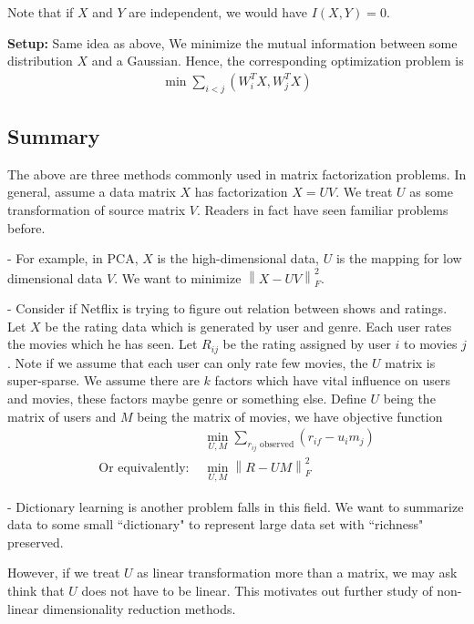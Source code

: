 Note that if $X$ and $Y$ are independent, we would have $I(X,Y) = 0$.

\textbf{Setup:}
Same idea as above, We minimize the mutual information between some distribution $X$ and a Gaussian. Hence, the corresponding optimization problem is
\begin{align*}
    \min \sum _{i<j} (W_i^TX,W^T_jX)
\end{align*}

\subsection{Summary}
The above are three methods commonly used in matrix factorization problems. In general, assume a data matrix $X$ has factorization $X = UV$. We treat $U$ as some transformation of source matrix $V$. Readers in fact have seen familiar problems before. 

- For example, in PCA, $X$ is the high-dimensional data, $U$ is the mapping for low dimensional data $V$. We want to minimize $\left\lVert X - UV\right\rVert^2_F$.

- Consider if Netflix is trying to figure out relation between shows and ratings. Let $X$ be the rating data which is generated by user and genre. Each user rates the movies which he has seen.
Let $R_{ij}$ be the rating assigned by user $i$ to movies $j$. Note if we assume that each user can only rate few movies, the $U$ matrix is super-sparse. We assume there are $k$ factors which have vital influence on users and movies, these factors maybe genre or something else. Define $U$ being the matrix of users and $M$ being the matrix of movies, we have objective function 
\begin{align*}
&\min_{U,M}\sum_{r_{ij} \text{ observed}}(r_{if} - u_im_j)\\
\text{Or equivalently: } & \min_{U,M} \left\lVert R - UM\right\rVert^2_F
\end{align*}

- Dictionary learning is another problem falls in this field. We want to summarize data to some small ``dictionary" to represent large data set with ``richness" preserved.

However, if we treat $U$ as linear transformation more than a matrix, we may ask think that $U$ does not have to be linear. This motivates out further study of non-linear dimensionality reduction methods.
